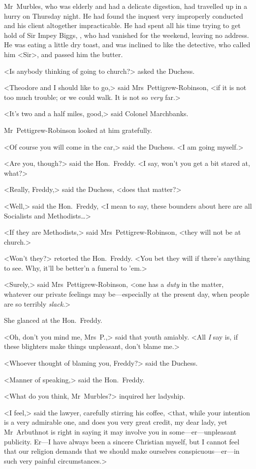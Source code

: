 Mr~Murbles, who was elderly and had a delicate digestion, had travelled up in a hurry on Thursday night. He had found the inquest very improperly conducted and his client altogether impracticable. He had spent all his time trying to get hold of Sir Impey Biggs, , who had vanished for the weekend, leaving no address. He was eating a little dry toast, and was inclined to like the detective, who called him <Sir>, and passed him the butter.

<Is anybody thinking of going to church?> asked the Duchess.

<Theodore and I should like to go,> said Mrs~Pettigrew-Robinson, <if it is not too much trouble; or we could walk. It is not so \emph{very} far.>

<It's two and a half miles, good,> said Colonel Marchbanks.

Mr~Pettigrew-Robinson looked at him gratefully.

<Of course you will come in the car,> said the Duchess. <I am going myself.>

<Are you, though?> said the Hon.~Freddy. <I say, won't you get a bit stared at, what?>

<Really, Freddy,> said the Duchess, <does that matter?>

<Well,> said the Hon.~Freddy, <I mean to say, these bounders about here are all Socialists and Methodists\dots>

<If they are Methodists,> said Mrs~Pettigrew-Robinson, <they will not be at church.>

<Won't they?> retorted the Hon.~Freddy. <You bet they will if there's anything to see. Why, it'll be better'n a funeral to 'em.>

<Surely,> said Mrs~Pettigrew-Robinson, <one has a \emph{duty} in the matter, whatever our private feelings may be—especially at the present day, when people are so terribly \emph{slack}.>

She glanced at the Hon.~Freddy.

<Oh, don't you mind me, Mrs~P\@.,> said that youth amiably. <All \emph{I} say is, if these blighters make things unpleasant, don't blame me.>

<Whoever thought of blaming you, Freddy?> said the Duchess.

<Manner of speaking,> said the Hon.~Freddy.

<What do you think, Mr~Murbles?> inquired her ladyship.

<I feel,> said the lawyer, carefully stirring his coffee, <that, while your intention is a very admirable one, and does you very great credit, my dear lady, yet Mr~Arbuthnot is right in saying it may involve you in some—er—unpleasant publicity. Er—I have always been a sincere Christian myself, but I cannot feel that our religion demands that we should make ourselves conspicuous—er—in such very painful circumstances.>

